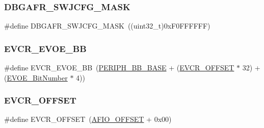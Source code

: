 \mbox{\label{group___g_p_i_o___private___defines_ga47a1cd3c0505a7be3e161671237d8460}} 
\subsubsection{\texorpdfstring{DBGAFR\_SWJCFG\_MASK}{DBGAFR\_SWJCFG\_MASK}}
{\footnotesize\ttfamily \#define D\+B\+G\+A\+F\+R\+\_\+\+S\+W\+J\+C\+F\+G\+\_\+\+M\+A\+SK~((uint32\+\_\+t)0x\+F0\+F\+F\+F\+F\+F\+F)}

\mbox{\label{group___g_p_i_o___private___defines_ga6e4f8c4e3def38811ac6c03b4f64240b}} 
\subsubsection{\texorpdfstring{EVCR\_EVOE\_BB}{EVCR\_EVOE\_BB}}
{\footnotesize\ttfamily \#define E\+V\+C\+R\+\_\+\+E\+V\+O\+E\+\_\+\+BB~(\mbox{\hyperlink{group___peripheral__memory__map_gaed7efc100877000845c236ccdc9e144a}{P\+E\+R\+I\+P\+H\+\_\+\+B\+B\+\_\+\+B\+A\+SE}} + (\mbox{\hyperlink{group___g_p_i_o___private___defines_gaf8c24f39392c89142f1b97a418669d5d}{E\+V\+C\+R\+\_\+\+O\+F\+F\+S\+ET}} $\ast$ 32) + (\mbox{\hyperlink{group___g_p_i_o___private___defines_ga8e4fdee57fe3447cdbc5d00ccab60c18}{E\+V\+O\+E\+\_\+\+Bit\+Number}} $\ast$ 4))}

\mbox{\label{group___g_p_i_o___private___defines_gaf8c24f39392c89142f1b97a418669d5d}} 
\subsubsection{\texorpdfstring{EVCR\_OFFSET}{EVCR\_OFFSET}}
{\footnotesize\ttfamily \#define E\+V\+C\+R\+\_\+\+O\+F\+F\+S\+ET~(\mbox{\hyperlink{group___g_p_i_o___private___defines_ga0ecdd0dd5180e1ee385c22f66a2cd660}{A\+F\+I\+O\+\_\+\+O\+F\+F\+S\+ET}} + 0x00)}


